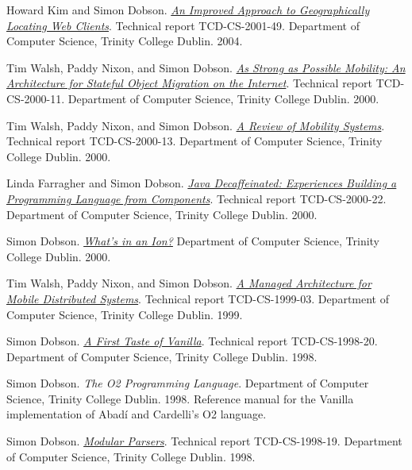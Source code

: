\documentclass[11pt]{article}
\begin{document}
\label{org7d9808f}Howard Kim and Simon Dobson.  \emph{\href{https://simondobson.org/softcopy/TCD-CS-2001-49.pdf}{An Improved Approach to Geographically Locating Web Clients}}. Technical report TCD-CS-2001-49. Department of Computer Science, Trinity College Dublin. 2004.

\label{org8d63353}Tim Walsh, Paddy Nixon, and Simon Dobson.  \emph{\href{https://simondobson.org/softcopy/TCD-CS-2000-11.pdf}{As Strong as Possible Mobility: An Architecture for Stateful Object Migration on the Internet}}. Technical report TCD-CS-2000-11. Department of Computer Science, Trinity College Dublin. 2000.

\label{org419e48d}Tim Walsh, Paddy Nixon, and Simon Dobson.  \emph{\href{https://simondobson.org/softcopy/TCD-CS-2000-13.pdf}{A Review of Mobility Systems}}. Technical report TCD-CS-2000-13. Department of Computer Science, Trinity College Dublin. 2000.

\label{org523d12e}Linda Farragher and Simon Dobson.  \emph{\href{https://simondobson.org/softcopy/TCD-CS-2000-22.pdf}{Java Decaffeinated: Experiences Building a Programming Language from Components}}. Technical report TCD-CS-2000-22. Department of Computer Science, Trinity College Dublin. 2000.

\label{org1554e23}Simon Dobson.  \emph{\href{https://simondobson.org/softcopy/ions-tr-1999.pdf}{What’s in an Ion?}} Department of Computer Science, Trinity College Dublin. 2000.

\label{orge127b52}Tim Walsh, Paddy Nixon, and Simon Dobson.  \emph{\href{https://simondobson.org/softcopy/TCD-CS-1999-03.pdf}{A Managed Architecture for Mobile Distributed Systems}}. Technical report TCD-CS-1999-03. Department of Computer Science, Trinity College Dublin. 1999.

\label{org647efc7}Simon Dobson.  \emph{\href{https://simondobson.org/softcopy/TCD-CS-1998-20.ps}{A First Taste of Vanilla}}. Technical report TCD-CS-1998-20. Department of Computer Science, Trinity College Dublin. 1998.

\label{org0e4f73d}Simon Dobson.  \emph{The O2 Programming Language}. Department of Computer Science, Trinity College Dublin. 1998. Reference manual for the Vanilla implementation of Abadí and Cardelli’s O2 language.

\label{org943a09a}Simon Dobson.  \emph{\href{https://simondobson.org/softcopy/TCD-CS-1998-19.ps}{Modular Parsers}}. Technical report TCD-CS-1998-19. Department of Computer Science, Trinity College Dublin. 1998.
\end{document}
